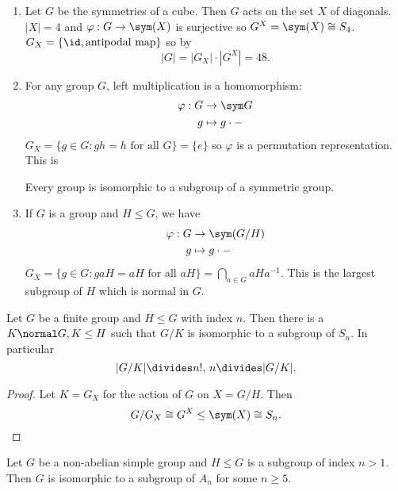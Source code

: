 \documentclass[a4paper]{article}
\begin{document}
\begin{eg}\leavevmode
  \begin{enumerate}
  \item Let \(G\) be the symmetries of a cube. Then \(G\) acts on the set \(X\) of diagonals. \(|X| = 4\) and \(\varphi: G \to \sym(X)\) is surjective so \(G^X = \sym(X) \cong S_4\). \(G_X = \{\id, \text{antipodal map}\}\) so by 
    \[
      |G| = |G_X| \cdot |G^X| = 48.
    \]
  \item For any group \(G\), left multiplication is a homomorphism:
    \begin{align*}
      \varphi: G &\to \sym G \\
      g &\mapsto g \cdot -
    \end{align*}
    \(G_X = \{g \in G: gh = h \text{ for all } G\} = \{e\}\) so \(\varphi\) is a permutation representation. This is

    \begin{theorem}[Cayley's]
      Every group is isomorphic to a subgroup of a symmetric group.
    \end{theorem}
  \item If \(G\) is a group and \(H \leq G\), we have
    \begin{align*}
      \varphi: G &\to \sym(G/H) \\
      g &\mapsto g \cdot -
    \end{align*}
    \(G_X = \{g \in G: gaH = aH \text{ for all } aH\} = \bigcap_{a \in G} aHa^{-1}\). This is the largest subgroup of \(H\) which is normal in \(G\).
  \end{enumerate}
\end{eg}

\begin{theorem}
  Let \(G\) be a finite group and \(H \leq G\) with index \(n\). Then there is a \(K \normal G, K \leq H\) such that \(G/K\) is isomorphic to a subgroup of \(S_n\). In particular
  \[
    |G/K| \divides n!, \, n \divides |G/K|.
  \]
\end{theorem}

\begin{proof}
  Let \(K = G_X\) for the action of \(G\) on \(X = G/H\). Then
  \[
    G/G_X \cong G^X \leq \sym(X) \cong S_n.
  \]
\end{proof}

\begin{theorem}
  Let \(G\) be a non-abelian simple group and \(H \leq G\) is a subgroup of index \(n > 1\). Then \(G\) is isomorphic to a subgroup of \(A_n\) for some \(n \geq 5\).
\end{theorem}
\end{document}
